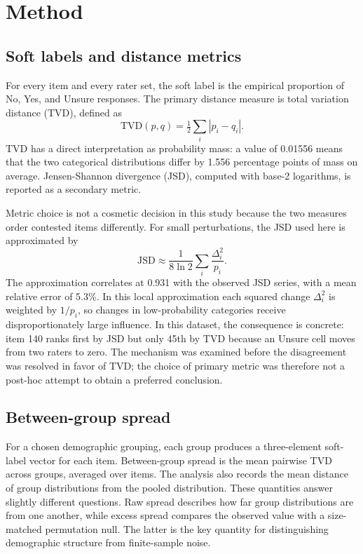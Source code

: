 \documentclass[11pt,a4paper]{article}
\begin{document}
\section{Method}

\subsection{Soft labels and distance metrics}

For every item and every rater set, the soft label is the empirical proportion of No, Yes, and
Unsure responses. The primary distance measure is total variation distance (TVD), defined as
\[
\mathrm{TVD}(p,q) = \tfrac{1}{2}\sum_i |p_i - q_i|.
\]
TVD has a direct interpretation as probability mass: a value of 0.01556 means that the two
categorical distributions differ by 1.556 percentage points of mass on average. Jensen-Shannon
divergence (JSD), computed with base-2 logarithms, is reported as a secondary metric.

Metric choice is not a cosmetic decision in this study because the two measures order contested
items differently. For small perturbations, the JSD used here is approximated by
\[
\mathrm{JSD} \approx \frac{1}{8\ln 2}\sum_i \frac{\Delta_i^2}{p_i}.
\]
The approximation correlates at 0.931 with the observed JSD series, with a mean relative error
of 5.3\%. In this local approximation each squared change $\Delta_i^2$ is weighted by
$1/p_i$, so changes in low-probability categories receive disproportionately large influence. In this dataset, the consequence is concrete: item
140 ranks first by JSD but only 45th by TVD because an Unsure cell moves from two raters to zero.
The mechanism was examined before the disagreement was resolved in favor of TVD; the choice of
primary metric was therefore not a post-hoc attempt to obtain a preferred conclusion.

\subsection{Between-group spread}

For a chosen demographic grouping, each group produces a three-element soft-label vector for each
item. Between-group spread is the mean pairwise TVD across groups, averaged over items. The
analysis also records the mean distance of group distributions from the pooled distribution.
These quantities answer slightly different questions. Raw spread describes how far group
distributions are from one another, while excess spread compares the observed value with a
size-matched permutation null. The latter is the key quantity for distinguishing demographic
structure from finite-sample noise.
\end{document}

